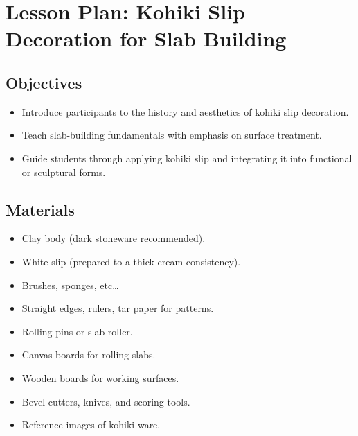 \documentclass[12pt]{scrartcl}
\begin{document}

\section*{Lesson Plan: Kohiki Slip Decoration for Slab Building}

\subsection*{Objectives}
\begin{itemize}
  \item Introduce participants to the history and aesthetics of kohiki slip decoration.
  \item Teach slab-building fundamentals with emphasis on surface treatment.
  \item Guide students through applying kohiki slip and integrating it into functional or sculptural forms.
\end{itemize}

\subsection*{Materials}
\begin{itemize}
  \item Clay body (dark stoneware recommended).
  \item White slip (prepared to a thick cream consistency).
  \item Brushes, sponges, etc\ldots
  \item Straight edges, rulers, tar paper for patterns.
  \item Rolling pins or slab roller.
  \item Canvas boards for rolling slabs.
  \item Wooden boards for working surfaces.
  \item Bevel cutters, knives, and scoring tools.
  \item Reference images of kohiki ware.
\end{itemize}
\end{document}
